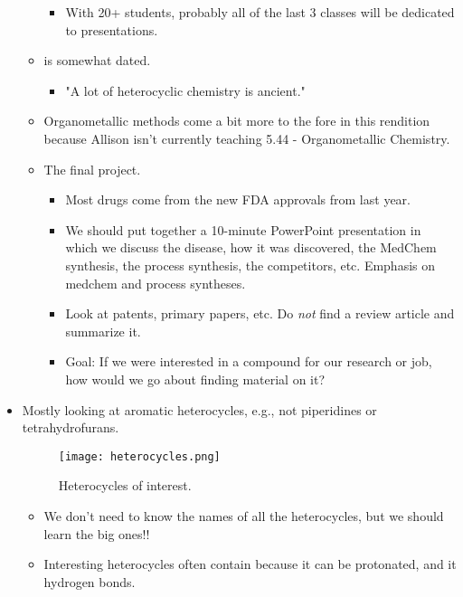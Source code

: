 \documentclass[../notes.tex]{subfiles}
\begin{document}
\begin{itemize}
\begin{itemize}
        \begin{itemize}
            \item With 20+ students, probably all of the last 3 classes will be dedicated to presentations.
        \end{itemize}
        \item \textcite{bib:JouleMills} is somewhat dated.
        \begin{itemize}
            \item "A lot of heterocyclic chemistry is ancient."
        \end{itemize}
        \item Organometallic methods come a bit more to the fore in this rendition because Allison isn't currently teaching 5.44 - Organometallic Chemistry.
        \item The final project.
        \begin{itemize}
            \item Most drugs come from the new FDA approvals from last year.
            \item We should put together a 10-minute PowerPoint presentation in which we discuss the disease, how it was discovered, the MedChem synthesis, the process synthesis, the competitors, etc. Emphasis on medchem and process syntheses.
            \item Look at patents, primary papers, etc. Do \emph{not} find a review article and summarize it.
            \item Goal: If we were interested in a compound for our research or job, how would we go about finding material on it?
        \end{itemize}
    \end{itemize}
    \item Mostly looking at aromatic heterocycles, e.g., not piperidines or tetrahydrofurans.
    \begin{figure}[H]
        \centering
        \texttt{[image: heterocycles.png]}
        \caption{Heterocycles of interest.}
        \label{fig:heterocycles}
    \end{figure}
    \begin{itemize}
        \item We don't need to know the names of all the heterocycles, but we should learn the big ones!!
        \item Interesting heterocycles often contain because it can be protonated, and it hydrogen bonds.
        \begin{itemize}

\end{itemize}
\end{itemize}
\end{itemize}
\end{document}
